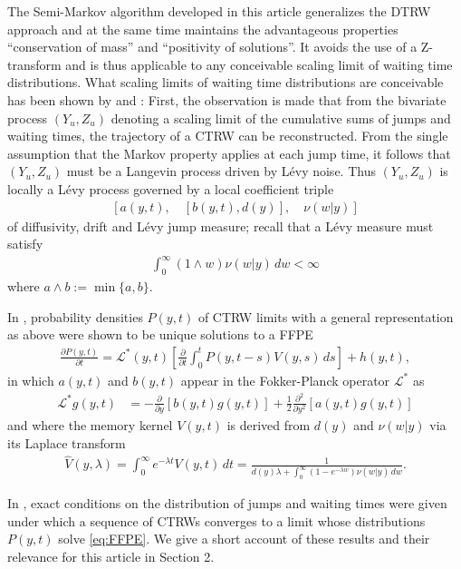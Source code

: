 \documentclass[a4paper,12pt]{elsarticle}
\numberwithin{equation}{section}
\theoremstyle{plain}
\theoremstyle{definition}
\theoremstyle{remark}
\numberwithin{equation}{section}
\newcommand{\1}{\mathbf 1}
\newcommand{\del}{\partial}
\begin{document}
The Semi-Markov algorithm developed in this article generalizes the DTRW approach and at the same time maintains the advantageous properties ``conservation of mass'' and ``positivity of solutions''.  It avoids the use of a Z-transform and is thus applicable to any conceivable scaling limit of waiting time distributions.  What scaling limits of waiting time distributions are conceivable has been shown by \cite{Straka17} and \cite{BaeumerStraka16}:  First, the observation is made that from the bivariate process $(Y_u, Z_u)$ denoting a scaling limit of the cumulative sums of jumps and waiting times, the trajectory of a CTRW can be reconstructed.
From the single assumption that the Markov property applies at each jump time, it follows that $(Y_u,Z_u)$ must be a Langevin process driven by L\'evy noise.
Thus $(Y_u, Z_u)$ is locally a L\'evy process governed by a local coefficient triple
\begin{align} \label{eq:triple}
[a(y,t), \quad [b(y,t), d(y)], \quad \nu(w|y)]
\end{align}
of diffusivity, drift  and L\'evy jump measure; recall that a L\'evy measure must satisfy
\begin{align}
\label{eq:Levy-measure}
\int_0^\infty (1 \wedge w) \nu(w|y)\,dw < \infty
\end{align}
where $a \wedge b := \min\{a, b\}$.

In \citep{BaeumerStraka16}, probability densities $P(y,t)$ of CTRW limits with a general representation as above were shown to be unique solutions to a FFPE
\begin{align} \label{eq:FFPE}
\frac{\del P(y,t)}{\del t} = \mathcal L^*(y,t) \left[ \frac{\partial}{\partial t}
\int_0^t P(y,t-s) V(y,s)\,ds \right] + h(y,t),
\end{align}
in which $a(y,t)$ and $b(y,t)$ appear in the Fokker-Planck operator
$\mathcal L^*$ as
\begin{align}
\label{eq:FPop}
\mathcal L^* g(y,t)
&= -\frac{\partial }{\partial y}[b(y,t) g(y,t)]
+\frac{1}{2}\frac{\partial^2 }{\partial y^2}[a(y,t) g(y,t)]
\end{align}
and where the memory kernel $V(y,t)$ is derived from $d(y)$ and $\nu(w|y)$ via its Laplace transform
\begin{align} \label{eq:LT-renewal-measure}
\hat V(y,\lambda) = \int_0^\infty e^{-\lambda t} V(y,t)\,dt
= \frac{1}{d(y)\lambda + \int_0^\infty (1-e^{-\lambda w})
\nu(w | y)\,dw}.
\end{align}

In \citep{Straka17}, exact conditions on the distribution of jumps and waiting times were given under which a sequence of CTRWs converges to a limit whose distributions $P(y,t)$ solve \eqref{eq:FFPE}.
We give a short account of these results and their relevance for this article in Section 2.
\end{document}
